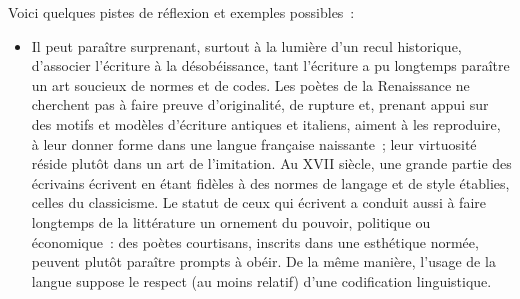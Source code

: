 {Voici quelques pistes de réflexion et exemples possibles~:

\begin{itemize}
\item Il peut paraître surprenant, surtout à la lumière d'un recul historique,
d'associer l'écriture à la désobéissance, tant l'écriture a pu longtemps paraître
un art soucieux de normes et de codes. Les poètes de la Renaissance ne
cherchent pas à faire preuve d'originalité, de rupture et, prenant appui sur des
motifs et modèles d'écriture antiques et italiens, aiment à les reproduire, à leur
donner forme dans une langue française naissante~; leur virtuosité réside
plutôt dans un art de l'imitation. Au XVII\ieme{} siècle, une grande partie des
écrivains écrivent en étant fidèles à des normes de langage et de style
établies, celles du classicisme. Le statut de ceux qui écrivent a conduit aussi à
faire longtemps de la littérature un ornement du pouvoir, politique ou
économique~: des poètes courtisans, inscrits dans une esthétique normée,
peuvent plutôt paraître prompts à obéir. De la même manière, l'usage de la
langue suppose le respect (au moins relatif) d'une codification linguistique.


\end{itemize}}
